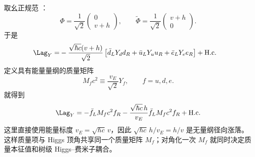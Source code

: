 \begin{definition}[真空产生的质量矩阵]
取幺正规范 ：
\begin{equation*}
 \Phi=\frac1{\sqrt2}\begin{pmatrix}0\\v+h\end{pmatrix},
 \qquad
 \widetilde\Phi=\frac1{\sqrt2}\begin{pmatrix}v+h\\0\end{pmatrix}.
\end{equation*}
于是
\begin{align*}
 \Lag_Y
 =&-\frac{\sqrt{\hbar c}(v+h)}{\sqrt2}
 \left[
 \bar d_LY_dd_R+\bar u_LY_uu_R+\bar e_LY_ee_R
 \right]+\mathrm{H.c.}
\end{align*}
定义具有能量量纲的质量矩阵
\begin{equation}
 \boxed{
 M_f c^2\equiv\frac{v_E}{\sqrt2}Y_f,
 \qquad f=u,d,e.}
 \label{eq:sm-mass-matrix-yukawa-dp11}
\end{equation}
就得到
\begin{equation}
 \Lag_Y
 =-\bar f_LM_fc^2f_R
 -\frac{\sqrt{\hbar c}\,h}{v_E}
 \bar f_LM_fc^2 f_R+\mathrm{H.c.}
 \label{eq:yukawa-mass-higgs-before-diag-dp11}
\end{equation}
这里直接使用能量标度 $v_E=\sqrt{\hbar c}\,v$，因此 $\sqrt{\hbar c}\,h/v_E=h/v$ 是无量纲径向涨落。这样质量项与 Higgs 顶角共享同一个质量矩阵 $M_f$；对角化一次 $M_f$ 就同时决定质量本征值和树级 Higgs--费米子耦合。
\end{definition}

